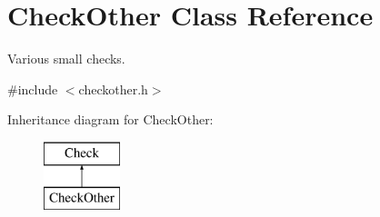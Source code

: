 \hypertarget{class_check_other}{\section{Check\-Other Class Reference}
\label{class_check_other}
}


Various small checks.  




{\ttfamily \#include $<$checkother.\-h$>$}

Inheritance diagram for Check\-Other\-:\begin{figure}[H]
\begin{center}
\leavevmode
\includegraphics[height=2.000000cm]{class_check_other}
\end{center}
\end{figure}
